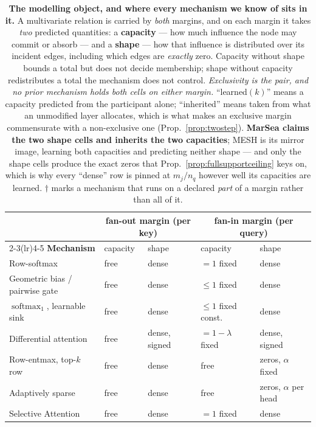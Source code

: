 \documentclass{article}
\newcommand{\softmaxop}{\operatorname{softmax}}
\begin{document}
\begin{table}[t]
\centering
\caption{\textbf{The modelling object, and where every mechanism we know of sits in it.} A
multivariate relation is carried by \emph{both} margins, and on each margin it takes \emph{two}
predicted quantities: a \textbf{capacity} --- how much influence the node may commit or absorb ---
and a \textbf{shape} --- how that influence is distributed over its incident edges, including
which edges are \emph{exactly} zero. Capacity without shape bounds a total but does not decide
membership; shape without capacity redistributes a total the mechanism does not control.
\emph{Exclusivity is the pair, and no prior mechanism holds both cells on either margin.}
``learned$(k)$'' means a capacity predicted from the participant alone; ``inherited'' means taken
from what an unmodified layer allocates, which is what makes an exclusive margin commensurate
with a non-exclusive one (Prop.~\ref{prop:twostep}). \textbf{MarSea claims the two shape cells and
inherits the two capacities}; MESH is its mirror image, learning both capacities and predicting
neither shape --- and only the shape cells produce the exact zeros that
Prop.~\ref{prop:fullsupportceiling} keys on, which is why every ``dense'' row is pinned at
$m_j/n_q$ however well its capacities are learned. $\dagger$ marks a mechanism that runs on a
declared \emph{part} of a margin rather than all of it.}
\label{tab:object}
\scriptsize
\setlength{\tabcolsep}{4pt}
\begin{tabular}{@{}lllll@{}}
\toprule
& \multicolumn{2}{c}{\textbf{fan-out margin (per key)}} & \multicolumn{2}{c}{\textbf{fan-in margin (per query)}} \\
\cmidrule(lr){2-3}\cmidrule(lr){4-5}
\textbf{Mechanism} & capacity & shape & capacity & shape \\
\midrule
Row-softmax & free & dense & $=1$ fixed & dense \\
Geometric bias / pairwise gate & free & dense & $\le 1$ fixed & dense \\
$\softmaxop_1$, learnable sink & free & dense & $\le 1$ fixed const.\ & dense \\
Differential attention & free & dense, signed & $=1-\lambda$ fixed & dense, signed \\
Row-entmax, top-$k$ row & free & dense & free & zeros, $\alpha$ fixed \\
Adaptively sparse & free & dense & free & zeros, $\alpha$ per head \\
Selective Attention & free & dense & $=1$ fixed & dense \\

\end{tabular}
\end{table}
\end{document}
